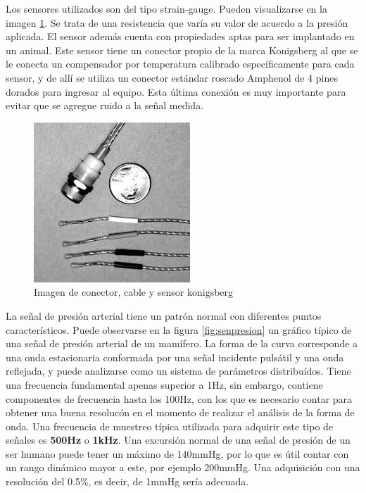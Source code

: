 Los sensores utilizados son del tipo strain-gauge. Pueden visualizarse en la imagen \ref{fig:konigsberg}. Se trata de una resistencia que varía su valor de acuerdo a la presión aplicada. El sensor además cuenta con propiedades aptas para ser implantado en un animal. Este sensor tiene un conector propio de la marca Konigsberg al que se le conecta un compensador por temperatura calibrado específicamente para cada sensor, y de allí se utiliza un conector estándar roscado Amphenol de 4 pines dorados para ingresar al equipo. Esta última conexión es muy importante para evitar que se agregue ruido a la señal medida.

\begin{figure}[!htbp]
	\centering
	\includegraphics[width=\textwidth]{./Figures/konigsberg.jpeg}
	\caption{Imagen de conector, cable y sensor konigsberg}
	\label{fig:konigsberg}
\end{figure}

La señal de presión arterial tiene un patrón normal con diferentes puntos característicos. Puede observarse en la figura \ref{fig:senpresion} un gráfico típico de una señal de presión arterial de un mamífero. La forma de la curva corresponde a una onda estacionaria conformada por una señal incidente pulsátil y una onda reflejada, y puede analizarse como un sistema de parámetros distribuídos. Tiene una frecuencia fundamental apenas superior a 1Hz, sin embargo, contiene componentes de frecuencia hasta los 100Hz, con los que es necesario contar para obtener una buena resolucón en el momento de realizar el análisis de la forma de onda. Una frecuencia de muestreo típica utilizada para adquirir este tipo de señales es \textbf{500Hz} o \textbf{1kHz}. Una excursión normal de una señal de presión de un ser humano puede tener un máximo de 140mmHg, por lo que es útil contar con un rango dinámico mayor a este, por ejemplo 200mmHg. Una adquisición con una resolución del 0.5\%, es decir, de 1mmHg sería adecuada.

